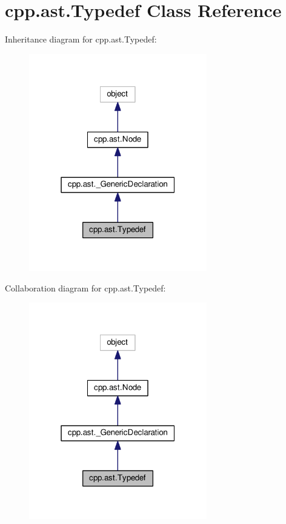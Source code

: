 \hypertarget{classcpp_1_1ast_1_1Typedef}{}\section{cpp.\+ast.\+Typedef Class Reference}
\label{classcpp_1_1ast_1_1Typedef}


Inheritance diagram for cpp.\+ast.\+Typedef\+:\nopagebreak
\begin{figure}[H]
\begin{center}
\leavevmode
\includegraphics[width=220pt]{classcpp_1_1ast_1_1Typedef__inherit__graph}
\end{center}
\end{figure}


Collaboration diagram for cpp.\+ast.\+Typedef\+:\nopagebreak
\begin{figure}[H]
\begin{center}
\leavevmode
\includegraphics[width=220pt]{classcpp_1_1ast_1_1Typedef__coll__graph}
\end{center}
\end{figure}

